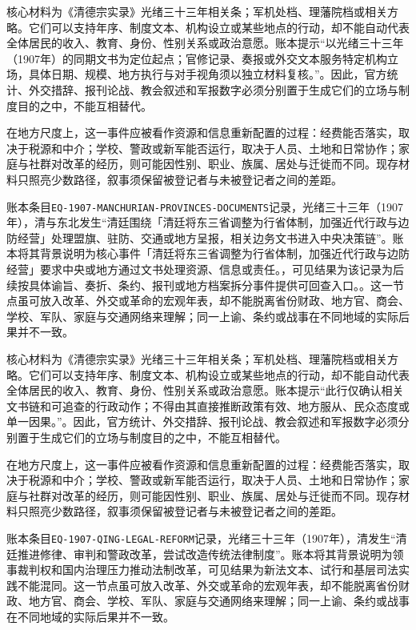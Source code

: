 核心材料为《清德宗实录》光绪三十三年相关条；军机处档、理藩院档或相关方略。它们可以支持年序、制度文本、机构设立或某些地点的行动，却不能自动代表全体居民的收入、教育、身份、性别关系或政治意愿。账本提示“以光绪三十三年（1907年）的同期文书为定位起点；官修记录、奏报或外交文本服务特定机构立场，具体日期、规模、地方执行与对手视角须以独立材料复核。”。因此，官方统计、外交措辞、报刊论战、教会叙述和军报数字必须分别置于生成它们的立场与制度目的之中，不能互相替代。

在地方尺度上，这一事件应被看作资源和信息重新配置的过程：经费能否落实，取决于税源和中介；学校、警政或新军能否运行，取决于人员、土地和日常协作；家庭与社群对改革的经历，则可能因性别、职业、族属、居处与迁徙而不同。现存材料只照亮少数路径，叙事须保留被登记者与未被登记者之间的差距。

账本条目\texttt{EQ-1907-MANCHURIAN-PROVINCES-DOCUMENTS}记录，光绪三十三年（1907年），清与东北发生“清廷围绕「清廷将东三省调整为行省体制，加强近代行政与边防经营」处理盟旗、驻防、交通或地方呈报，相关边务文书进入中央决策链”。账本将其背景说明为核心事件「清廷将东三省调整为行省体制，加强近代行政与边防经营」要求中央或地方通过文书处理资源、信息或责任。，可见结果为该记录为后续按具体谕旨、奏折、条约、报刊或地方档案拆分事件提供可回查入口。。这一节点虽可放入改革、外交或革命的宏观年表，却不能脱离省份财政、地方官、商会、学校、军队、家庭与交通网络来理解；同一上谕、条约或战事在不同地域的实际后果并不一致。

核心材料为《清德宗实录》光绪三十三年相关条；军机处档、理藩院档或相关方略。它们可以支持年序、制度文本、机构设立或某些地点的行动，却不能自动代表全体居民的收入、教育、身份、性别关系或政治意愿。账本提示“此行仅确认相关文书链和可追查的行政动作；不得由其直接推断政策有效、地方服从、民众态度或单一因果。”。因此，官方统计、外交措辞、报刊论战、教会叙述和军报数字必须分别置于生成它们的立场与制度目的之中，不能互相替代。

在地方尺度上，这一事件应被看作资源和信息重新配置的过程：经费能否落实，取决于税源和中介；学校、警政或新军能否运行，取决于人员、土地和日常协作；家庭与社群对改革的经历，则可能因性别、职业、族属、居处与迁徙而不同。现存材料只照亮少数路径，叙事须保留被登记者与未被登记者之间的差距。

账本条目\texttt{EQ-1907-QING-LEGAL-REFORM}记录，光绪三十三年（1907年），清发生“清廷推进修律、审判和警政改革，尝试改造传统法律制度”。账本将其背景说明为领事裁判权和国内治理压力推动法制改革，可见结果为新法文本、试行和基层司法实践不能混同。这一节点虽可放入改革、外交或革命的宏观年表，却不能脱离省份财政、地方官、商会、学校、军队、家庭与交通网络来理解；同一上谕、条约或战事在不同地域的实际后果并不一致。

